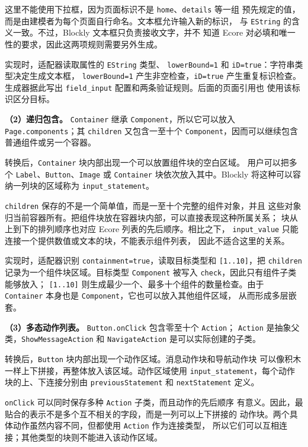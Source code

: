 这里不能使用下拉框，因为页面标识不是 \texttt{home}、\texttt{details} 等一组
预先规定的值，而是由建模者为每个页面自行命名。文本框允许输入新的标识，
与 \texttt{EString} 的含义一致。不过，Blockly 文本框只负责接收文字，并不
知道 Ecore 对必填和唯一性的要求，因此这两项规则需要另外生成。

实现时，适配器读取属性的 \texttt{EString} 类型、
\texttt{lowerBound=1} 和 \texttt{iD=true}：字符串类型决定生成文本框，
\texttt{lowerBound=1} 产生非空检查，\texttt{iD=true} 产生重复标识检查。
生成器据此写出 \texttt{field\_input} 配置和两条验证规则。后面的页面引用也
使用该标识区分目标。

\textbf{（2）递归包含。}
\texttt{Container} 继承 \texttt{Component}，所以它可以放入
\texttt{Page.components}；其 \texttt{children} 又包含一至十个
\texttt{Component}，因而可以继续包含普通组件或另一个容器。

转换后，\texttt{Container} 块内部出现一个可以放置组件块的空白区域。
用户可以把多个 \texttt{Label}、\texttt{Button}、\texttt{Image} 或
\texttt{Container} 块依次放入其中。Blockly 将这种可以容纳一列块的区域称为
\texttt{input\_statement}。

\texttt{children} 保存的不是一个简单值，而是一至十个完整的组件对象，并且
这些对象归当前容器所有。把组件块放在容器块内部，可以直接表现这种所属关系；
块从上到下的排列顺序也对应 Ecore 列表的先后顺序。相比之下，
\texttt{input\_value} 只能连接一个提供数值或文本的块，不能表示组件列表，
因此不适合这里的关系。

实现时，适配器识别 \texttt{containment=true}，读取目标类型和
\texttt{[1..10]}，把 \texttt{children} 记录为一个组件块区域。目标类型
\texttt{Component} 被写入 \texttt{check}，因此只有组件子类能够放入；
\texttt{[1..10]} 则生成最少一个、最多十个组件的数量检查。由于
\texttt{Container} 本身也是 \texttt{Component}，它也可以放入其他组件区域，
从而形成多层嵌套。

\textbf{（3）多态动作列表。}
\texttt{Button.onClick} 包含零至十个 \texttt{Action}；
\texttt{Action} 是抽象父类，\texttt{ShowMessageAction} 和
\texttt{NavigateAction} 是可以实际创建的子类。

转换后，\texttt{Button} 块内部出现一个动作区域。消息动作块和导航动作块
可以像积木一样上下拼接，再整体放入该区域。动作区域使用
\texttt{input\_statement}，每个动作块的上、下连接分别由
\texttt{previousStatement} 和 \texttt{nextStatement} 定义。

\texttt{onClick} 可以同时保存多种 \texttt{Action} 子类，而且动作的先后顺序
有意义。因此，最贴合的表示不是多个互不相关的字段，而是一列可以上下拼接的
动作块。两个具体动作虽然内容不同，但都使用 \texttt{Action} 作为连接类型，
所以它们可以互相连接；其他类型的块则不能进入该动作区域。

